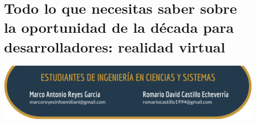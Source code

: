 \documentclass[12pt,spanish,Letterpaper,openany]{book}
\begin{document}
\hypertarget{pareja27}{%
\chapter{Todo lo que necesitas saber sobre la oportunidad de la década para desarrolladores: realidad virtual}\label{pareja27}}

\begin{center}\includegraphics[width=1\linewidth]{images/pareja27_image1} \end{center}
\end{document}
